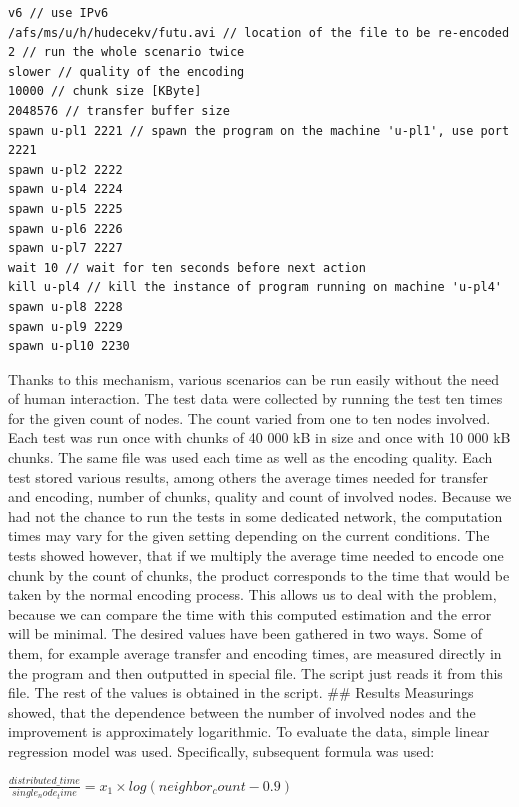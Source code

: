 \begin{samepage}
\begin{verbatim}
v6 // use IPv6
/afs/ms/u/h/hudecekv/futu.avi // location of the file to be re-encoded
2 // run the whole scenario twice
slower // quality of the encoding
10000 // chunk size [KByte]
2048576 // transfer buffer size
spawn u-pl1 2221 // spawn the program on the machine 'u-pl1', use port 2221
spawn u-pl2 2222
spawn u-pl4 2224
spawn u-pl5 2225
spawn u-pl6 2226
spawn u-pl7 2227
wait 10 // wait for ten seconds before next action
kill u-pl4 // kill the instance of program running on machine 'u-pl4'
spawn u-pl8 2228
spawn u-pl9 2229
spawn u-pl10 2230
\end{verbatim}
\end{samepage}

Thanks to this mechanism, various scenarios can be run easily without
the need of human interaction. The test data were collected by running
the test ten times for the given count of nodes. The count varied from
one to ten nodes involved. Each test was run once with chunks of 40 000
kB in size and once with 10 000 kB chunks. The same file was used each
time as well as the encoding quality. Each test stored various results,
among others the average times needed for transfer and encoding, number
of chunks, quality and count of involved nodes. Because we had not the
chance to run the tests in some dedicated network, the computation times
may vary for the given setting depending on the current conditions. The
tests showed however, that if we multiply the average time needed to
encode one chunk by the count of chunks, the product corresponds to the
time that would be taken by the normal encoding process. This allows us
to deal with the problem, because we can compare the time with this
computed estimation and the error will be minimal. The desired values
have been gathered in two ways. Some of them, for example average
transfer and encoding times, are measured directly in the program and
then outputted in special file. The script just reads it from this file.
The rest of the values is obtained in the script. \#\# Results
Measurings showed, that the dependence between the number of involved
nodes and the improvement is approximately logarithmic. To evaluate the
data, simple linear regression model was used. Specifically, subsequent
formula was used:

\begin{center}
$\frac{distributed\_time}{single_node_time} = x_1 \times log(neighbor_count - 0.9)$
\end{center}

